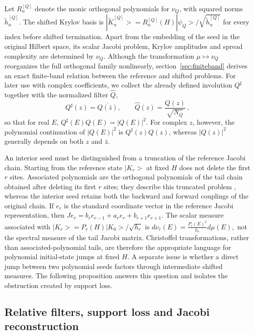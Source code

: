 \documentclass[a4paper,11pt]{article}
\def\ket#1{|#1>}%
\def\dd{d}%
\def\Jac{J}%
\theoremstyle{definition}
\theoremstyle{remark}
\newcommand{\ket}[1]{|#1\rangle}
\newcommand{\dd}{\mathrm d}
\newcommand{\Jac}{\mathsf J}
\newcommand{\thh}{\widetilde h}
\newcommand{\Qhat}{\widehat Q}
\newcommand{\Qsh}{Q^{\sharp}}
\begin{document}
Let $R_n^{[Q]}$ denote the monic orthogonal polynomials for $\nu_Q$, with squared norms $\thh_n^{[Q]}$. The shifted Krylov basis is
$
   \ket{\widetilde K_n^{[Q]}}
   =
   R_n^{[Q]}(H)\ket{\psi_Q}/\sqrt{\thh_n^{[Q]}}
$
for every index before shifted termination. Apart from the embedding of the seed in the original Hilbert space, its scalar Jacobi problem, Krylov amplitudes and spread complexity are determined by $\nu_Q$. Although the transformation $\mu\mapsto\nu_Q$ reorganizes the full orthogonal family nonlinearly, section~\ref{sec:finiteband} derives an exact finite-band relation between the reference and shifted problems. For later use with complex coefficients, we collect the already defined involution $\Qsh$ together with the normalized filter $\Qhat$,
\begin{equation}
   \Qsh(z)=\overline{Q(\bar z)},
   \qquad
   \Qhat(z)=\frac{Q(z)}{\sqrt{N_Q}}\,,
   \label{eq:Qsharp-Qhat}
\end{equation}
so that for real $E$, $\Qsh(E)Q(E)=|Q(E)|^2$. For complex $z$, however, the polynomial continuation of $|Q(E)|^2$ is $\Qsh(z)Q(z)$, whereas $|Q(z)|^2$ generally depends on both $z$ and $\bar z$.

An interior seed must be distinguished from a truncation of the reference Jacobi chain. Starting from the reference state $\ket{K_r}$ at fixed $H$ does not delete the first $r$ sites. Associated polynomials are the orthogonal polynomials of the tail chain obtained after deleting its first $r$ sites; they describe this truncated problem  \cite{Chihara1978,SimonOPRL1}, whereas the interior seed retains both the backward and forward couplings of the original chain. If $e_r$ is the standard coordinate vector in the reference Jacobi representation, then
$
   \Jac e_r=b_re_{r-1}+a_re_r+b_{r+1}e_{r+1}.
$
The scalar measure associated with
$\ket{K_r}=P_r(H)\ket{K_0}/\sqrt{h_r}$ is
$
   \dd\nu_r(E)=\frac{P_r(E)^2}{h_r}\dd\mu(E),
$
not the spectral measure of the tail Jacobi matrix. Christoffel transformations, rather than associated-polynomial tails, are therefore the appropriate language for polynomial initial-state jumps at fixed $H$. A separate issue is whether a direct jump between two polynomial seeds factors through intermediate shifted measures. The following proposition answers this question and isolates the obstruction created by support loss.

\subsection{Relative filters, support loss and Jacobi reconstruction}
\label{subsec:relative-filters-support}
\end{document}
